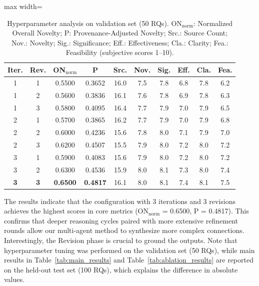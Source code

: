 \documentclass[runningheads]{llncs}
\begin{document}
\begin{table}[t]
\centering
\small
\begin{adjustbox}{max width=\textwidth}
\begin{tabular}{cccccccccc}
\toprule
\textbf{Iter.} & \textbf{Rev.} & \textbf{ON$_{\text{norm}}$} & \textbf{P} & \textbf{Src.} & \textbf{Nov.} & \textbf{Sig.} & \textbf{Eff.} & \textbf{Cla.} & \textbf{Fea.} \\
\midrule
1 & 1 & 0.5500 & 0.3652 & 16.0 & 7.5 & 7.8 & 6.8 & 7.8 & 6.2 \\
1 & 2 & 0.5600 & 0.3836 & 16.1 & 7.6 & 7.8 & 6.9 & 7.8 & 6.3 \\
1 & 3 & 0.5800 & 0.4095 & 16.4 & 7.7 & 7.9 & 7.0 & 7.9 & 6.5 \\
2 & 1 & 0.5700 & 0.3865 & 16.2 & 7.7 & 7.9 & 7.0 & 7.9 & 6.8 \\
2 & 2 & 0.6000 & 0.4236 & 15.6 & 7.8 & 8.0 & 7.1 & 7.9 & 7.0 \\
2 & 3 & 0.6200 & 0.4507 & 15.5 & 7.9 & 8.0 & 7.2 & 8.0 & 7.2 \\
3 & 1 & 0.5900 & 0.4083 & 15.6 & 7.9 & 8.0 & 7.2 & 8.0 & 7.2 \\
3 & 2 & 0.6300 & 0.4536 & 15.9 & 8.0 & 8.1 & 7.3 & 8.0 & 7.4 \\
\textbf{3} & \textbf{3} & \textbf{0.6500} & \textbf{0.4817} & 16.1 & 8.0 & 8.1 & 7.4 & 8.1 & 7.5 \\
\bottomrule
\end{tabular}
\end{adjustbox}
\caption{Hyperparameter analysis on validation set (50 RQs). ON$_{\text{norm}}$: Normalized Overall Novelty; P: Provenance-Adjusted Novelty; Src.: Source Count; Nov.: Novelty; Sig.: Significance; Eff.: Effectiveness; Cla.: Clarity; Fea.: Feasibility (subjective scores 1--10).}
\label{tab:hyperparam_results}
\end{table}

The results indicate that the configuration with 3 iterations and 3 revisions achieves the highest scores in core metrics (ON$_{\text{norm}}$ = 0.6500, P = 0.4817). This confirms that deeper reasoning cycles paired with more extensive refinement rounds allow our multi-agent method to synthesize more complex connections. Interestingly, the Revision phase is crucial to ground the outputs. Note that hyperparameter tuning was performed on the validation set (50 RQs), while main results in Table~\ref{tab:main_results} and Table~\ref{tab:ablation_results} are reported on the held-out test set (100 RQs), which explains the difference in absolute values.
\end{document}
